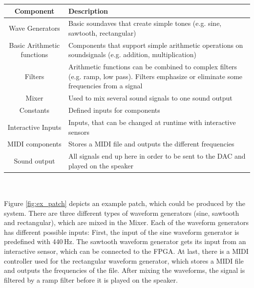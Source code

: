 	 \begin{tabular}[h]{|c|p{9.75cm}|}
	  \hline
	  Component & Description \\
	  \hline
	  \hline
	  Wave Generators & Basic soundaves that create simple tones (e.g. sine, sawtooth, rectangular) \\\hline
		Basic Arithmetic functions & Components that support simple arithmetic operations on soundsignals (e.g. addition, multiplication)\\\hline
		Filters & Arithmetic functions can be combined to complex filters (e.g. ramp, low pass). Filters emphasize or eliminate some frequencies from a signal \\\hline
		Mixer & Used to mix several sound signals to one sound output \\\hline
		Constants & Defined inputs for components \\\hline
		Interactive Inputs & Inputs, that can be changed at runtime with interactive sensors \\\hline
		MIDI components & Stores a MIDI file and outputs the different frequencies \\\hline
		Sound output & All signals end up here in order to be sent to the \ac{DAC} and played on the speaker \\\hline
	 \end{tabular}
\\\\


Figure \ref{fig:ex_patch} depicts an example patch, which could be produced by the system. 
There are three different types of waveform generators (sine, sawtooth and rectangular), which are mixed in the Mixer. 
Each of the waveform generators has different possible inputs: 
First, the input of the sine waveform generator is predefined with 440\,Hz. 
The sawtooth waveform generator gets its input from an interactive sensor, which can be connected to the \ac{FPGA}. 
At last, there is a MIDI controller used for the rectangular waveform generator, which stores a MIDI file and outputs the frequencies of the file.
After mixing the waveforms, the signal is filtered by a ramp filter before it is played on the speaker.

